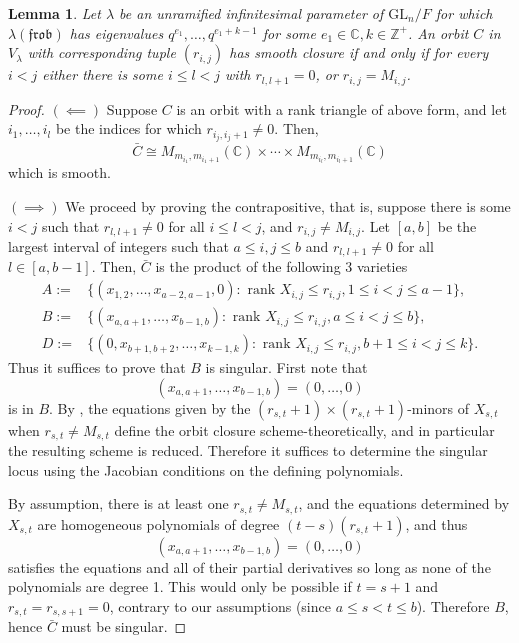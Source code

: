 \documentclass[12pt]{amsart}
\theoremstyle{plain}
\newtheorem{lemma}[theorem]{Lemma}
\theoremstyle{definition}
\newcommand{\mf}{\mathfrak}
\newcommand{\bc}{\mathbb{C}}
\newcommand{\bz}{\mathbb{Z}}
\newcommand{\tx}{\text}
\newcommand{\1}{\mathbbm{1}}
\newcommand{\GL}{\mathrm{GL}}
\begin{document}
	
	\begin{lemma}\label{lem}
		Let $\lambda$ be an unramified infinitesimal parameter of $\GL_n/F$ for which $\lambda(\mf{frob})$ has eigenvalues $q^{e_1}, \ldots, q^{e_1+k-1}$ for some $e_1\in \bc, k\in \bz^+$.  
		An orbit $C$ in $V_\lambda$ with corresponding tuple $(r_{i,j})$ has smooth closure if and only if for every $i<j$ either there is some $i\leq l<j$ with $r_{l, l+1}=0$, or $r_{i,j}=M_{i,j}$. 
	\end{lemma}
	\begin{proof}
		$(\impliedby)$ Suppose $C$ is an orbit with a rank triangle of above form, and let $i_1, \ldots, i_l$ be the indices for which $r_{i_j, i_j+1}\neq 0$.  
		Then, 
		$$\bar{C}\cong M_{m_{i_1}, m_{i_1+1}}(\bc)\times\cdots \times M_{m_{i_l}, m_{i_l+1}}(\bc)$$
		which is smooth.  
		
		$(\implies)$  We proceed by proving the contrapositive, that is, suppose there is some $i<j$ such that $r_{l, l+1}\neq 0$ for all $i\leq l <j$, and $r_{i,j}\neq M_{i,j}$.   
		Let $[a, b]$ be the largest interval of integers such that $a\leq i, j\leq b$ and $r_{l, l+1}\neq 0$ for all $l\in [a, b-1]$.  
		Then, $\bar{C}$ is the product of the following 3 varieties
		\begin{align*}
			A:=&\{(x_{1,2}, \ldots, x_{a-2, a-1}, 0) : \tx{ rank } X_{i,j}\leq r_{i,j},  1\leq i <j\leq a-1\},\\
			B:=&\{(x_{a, a+1}, \ldots, x_{b-1, b}) : \tx{ rank } X_{i,j}\leq r_{i,j}, a\leq i <j\leq b\},\\
			D:=&\{(0, x_{b+1, b+2}, \ldots, x_{k-1, k}) : \tx{ rank } X_{i,j}\leq r_{i,j}, b+1\leq i <j\leq k\}.
		\end{align*}
		Thus it suffices to prove that $B$ is singular.  
		First note that 
		$$(x_{a, a+1}, \ldots, x_{b-1, b})=(0, \ldots, 0)$$
		is in $B$.  
		 By \cite[Theorem 2.2]{LM}, the equations given by the $(r_{s,t}+1)\times(r_{s,t}+1)$-minors of $X_{s, t}$ when $r_{s, t}\neq M_{s, t}$
		 define the orbit closure scheme-theoretically, and in particular the resulting scheme is reduced.  
		 Therefore it suffices to determine the singular locus using the Jacobian conditions on the defining polynomials.   
		
		By assumption, there is at least one $r_{s, t}\neq M_{s, t}$, and the equations determined by $X_{s, t}$ are homogeneous polynomials of degree $(t-s)(r_{s,t}+1)$, and thus
		$$(x_{a, a+1}, \ldots, x_{b-1, b})=(0, \ldots, 0)$$
		satisfies the equations and all of their partial derivatives so long as none of the polynomials are degree 1.  
		This would only be possible if $t=s+1$ and $r_{s, t}=r_{s, s+1}=0$, contrary to our assumptions (since $a\leq s<t\leq b$).  
		Therefore $B$, hence $\bar{C}$ must be singular. 
		

\end{proof}
\end{document}
